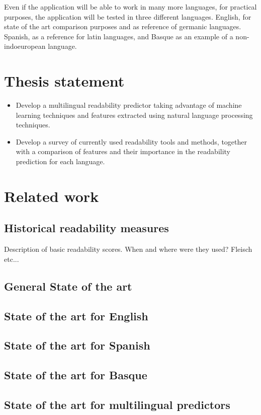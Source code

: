 \documentclass[12pt]{article}
\begin{document}
Even if the application will be able to work in many more languages, for practical purposes, the application will be tested in three different languages. English, for state of the art comparison purposes and as reference of germanic languages. Spanish, as a reference for latin languages, and Basque as an example of a non-indoeuropean language.



\section{Thesis statement}
\begin{itemize}
\item Develop a multilingual readability predictor taking advantage of machine learning techniques and features extracted using natural language processing techniques.
\item Develop a survey of currently used readability tools and methods, together with a comparison of features and their importance in the readability prediction for each language.

\end{itemize}

\section{Related work}
\subsection{Historical readability measures}
Description of basic readability scores. When and where were they used? Fleisch etc...
\subsection{General State of the art}

\subsection{State of the art for English}
\subsection{State of the art for Spanish}
\subsection{State of the art for Basque}

\subsection{State of the art for multilingual predictors}
\end{document}
